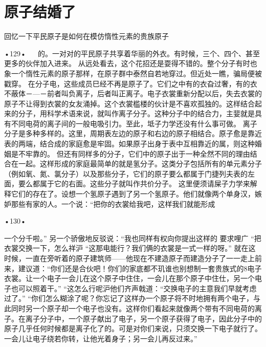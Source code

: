 \section{原子结婚了}

回忆一下平民原子是如何在模仿惰性元素的贵族原子

•129•
  
的。一对对的平民原子共享着华丽的外衣。有时候，三个、四个、甚至更多的伙伴加入进来。
从远处看去，这个花招还是耍得不错的。整个分子有时也象一个惰性元素的原子那样，在原子群中泰然自若地穿过。但近处一瞧，骗局便被戳穿。
在分子电，这些成员巳经不再是原子了。它们之中有的衣旮过奢，有的衣不蔽体－—－前者叫负离子，后者叫正离子。电子衣裳重新分配以后，失去衣裳的原子不让得到衣裳的女友涌掉。这个衣裳槛楼的伙计是不喜欢孤独的。这样结合起来的分子，用科学术语来说，就叫作离子分子。这种分子中的结合力，主婓就是具有不同电荷的离子间的一般电吸引力。至此，坻子力学还没有什么事可做。
离子分子是多种多样的。这里，周期表左边的原子和右边的原子相结合。原子愈是靠近表的两端，结合成的家庭愈是牢固。如果原子出身于表中互相靠近的属，则这种婚姻是不牢靠的。
但还有同样多的分子，它们中的原子出于一种全然不同的理由结合在一起。这样形成的家庭最简单的就是氢分子。这类分子包括所有的单元素分子（例如氧、氮、氯分子）以及那些分子，它们的原子要么都属于门捷列夫表的左面，要么都属于它的右面。这些分子就叫作共价分子。
这里便须请屎子力学来解释它们的存在了。设想一个氢原子遇到了另一个氢原子。他们就像两个单身汉，嫉妒那些有家的人。一个说：“把你的衣裳给我吧，这样我们就能形成

•130•


一个分千啦。”
另一个骄傲地反驳说：“我也同样有权向你提出这样的
要求哩广
“把衣裳交换一下，怎么祥沪
“这那电能行？我们俩的衣裳是一式一样的呀。”
就在这时候，一直在旁听着的原子建筑师——他现在不建造原子而建造分子了一一走上前来，建议道：“你们还是合伙吧！你们的家底都不玑谁也别想制一套贵族式的8电子衣裳。让一个电子一会儿在这个原子中住住，一会儿在那个原子中住仕，另一个电子也可以照着干。”
“这怎么行呢沪他们齐声戟道：“交换电子的主意我们早就考虑过了。”
“你们怎么糊涂了呢？你忘记了这样办一个原子将不时地拥有两个电子，与此同时另一个原子却一个电子也没有。这样你们看起来就像两个带有不同电荷的离子。在离子分子中，一个原子献出了电子，另一个原子获得了电子，因此分子中的原子几乎任何时候都是离子化了的。可是对你们来说，只须交换一下电子就行了。一会儿让电子绕若你转，让他光着身子；另一会儿再反过来。”

